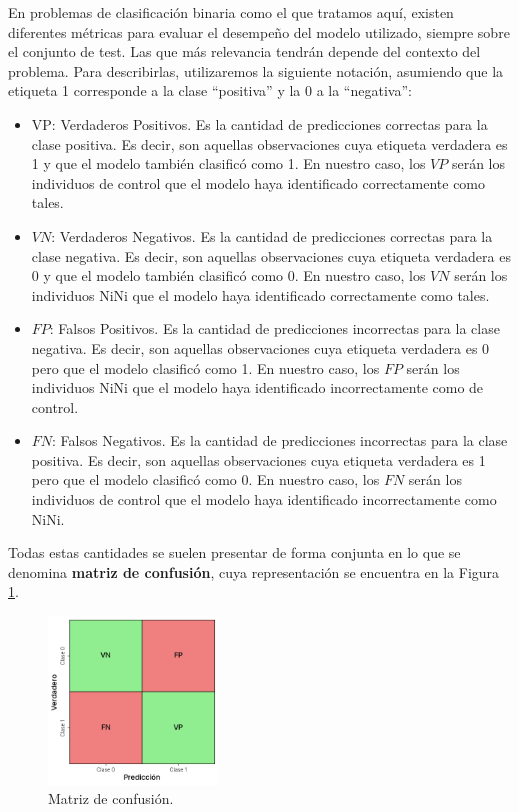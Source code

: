 \documentclass[../../main.tex]{subfiles}
\begin{document}
En problemas de clasificación binaria como el que tratamos aquí, existen diferentes
métricas para evaluar el desempeño del modelo utilizado, siempre sobre el conjunto de
test. Las que más relevancia tendrán depende del contexto del problema. Para describirlas,
utilizaremos la siguiente notación, asumiendo que la etiqueta 1 corresponde a la clase
``positiva'' y la 0 a la ``negativa'':
\begin{itemize}
    \item VP: Verdaderos Positivos. Es la cantidad de predicciones correctas para la
    clase positiva. Es decir, son aquellas observaciones cuya etiqueta verdadera es 1 y
    que el modelo también clasificó como 1. En nuestro caso, los \(VP\) serán los individuos
    de control que el modelo haya identificado correctamente como tales.
    \item \(VN\): Verdaderos Negativos. Es la cantidad de predicciones correctas para la
    clase negativa. Es decir, son aquellas observaciones cuya etiqueta verdadera es 0 y
    que el modelo también clasificó como 0. En nuestro caso, los \(VN\) serán los individuos
    NiNi que el modelo haya identificado correctamente como tales.
    \item \(FP\): Falsos Positivos. Es la cantidad de predicciones incorrectas para la
    clase negativa. Es decir, son aquellas observaciones cuya etiqueta verdadera es 0 pero
    que el modelo clasificó como 1. En nuestro caso, los \(FP\) serán los individuos NiNi
    que el modelo haya identificado incorrectamente como de control.
    \item \(FN\): Falsos Negativos. Es la cantidad de predicciones incorrectas para la
    clase positiva. Es decir, son aquellas observaciones cuya etiqueta verdadera es 1 pero
    que el modelo clasificó como 0. En nuestro caso, los \(FN\) serán los individuos de
    control que el modelo haya identificado incorrectamente como NiNi.
\end{itemize}

Todas estas cantidades se suelen presentar de forma conjunta en lo que se denomina
\textbf{matriz de confusión}, cuya representación se encuentra en la Figura
\ref{fig:confusion-matrix}.

\begin{figure}[ht]
    \centering
    \includegraphics[width=0.4\textwidth]{figs/matriz-confusion.png}
    \caption{Matriz de confusión.}
    \label{fig:confusion-matrix}
\end{figure}
\end{document}
